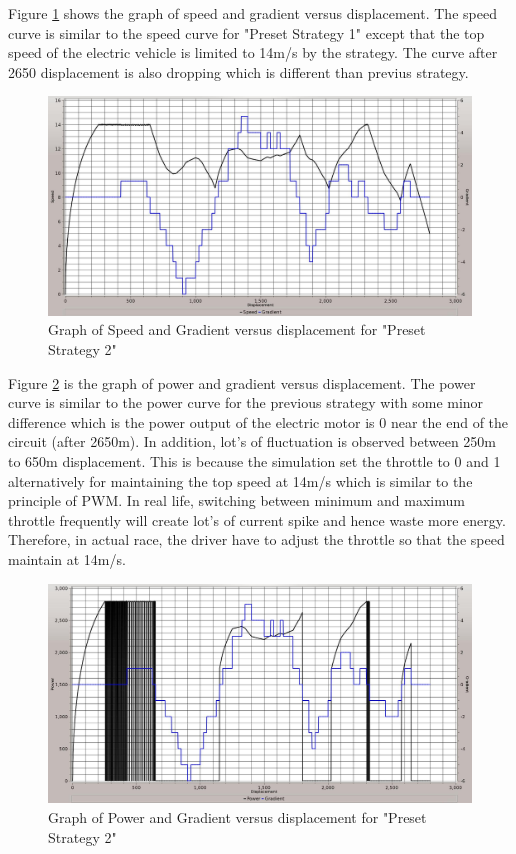 Figure \ref{im:2_1} shows the graph of speed and gradient versus displacement. The speed curve is similar to the speed curve for "Preset Strategy 1" except that the top speed of the electric vehicle is limited to 14m/s by the strategy. The curve after 2650 displacement is also dropping which is different than previus strategy. 

\begin{figure}[htb]
	\centering
	\includegraphics[width=6in]{images/2_1.jpg}
	\caption{Graph of Speed and Gradient versus displacement for "Preset Strategy 2"}
	\label{im:2_1}
\end{figure}

Figure \ref{im:2_2} is the graph of power and gradient versus displacement. The power curve is similar to the power curve for the previous strategy with some minor difference which is the power output of the electric motor is 0 near the end of the circuit (after 2650m). In addition, lot's of fluctuation is observed between 250m to 650m displacement. This is because the simulation set the throttle to 0 and 1 alternatively for maintaining the top speed at 14m/s which is similar to the principle of PWM. In real life, switching between minimum and maximum throttle frequently will create lot's of current spike and hence waste more energy. Therefore, in actual race, the driver have to adjust the throttle so that the speed maintain at 14m/s. 

\begin{figure}[htb]
	\centering
	\includegraphics[width=6in]{images/2_2.jpg}
	\caption{Graph of Power and Gradient versus displacement for "Preset Strategy 2"}
	\label{im:2_2}
\end{figure}


